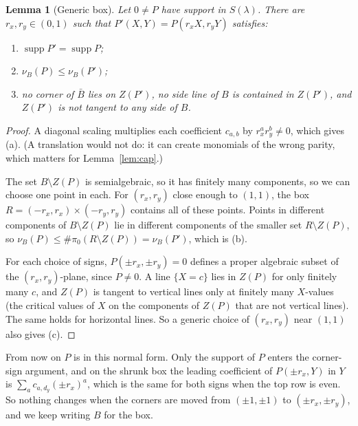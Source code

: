 \documentclass[11pt]{amsart}
\newtheorem{lemma}[theorem]{Lemma}
\theoremstyle{definition}
\theoremstyle{remark}
\newcommand{\supp}{\operatorname{supp}}
\numberwithin{equation}{section}
\begin{document}
\begin{lemma}[Generic box]\label{lem:box}
Let $0\ne P$ have support in $S(\lambda)$. There are $r_x,r_y\in(0,1)$ such that
$P'(X,Y)=P(r_xX,r_yY)$ satisfies:
\begin{enumerate}[label=(\alph*),nosep]
\item $\supp P'=\supp P$;
\item $\nu_B(P)\le\nu_B(P')$;
\item no corner of $\bar B$ lies on $Z(P')$, no side line of $B$ is contained in $Z(P')$,
and $Z(P')$ is not tangent to any side of $B$.
\end{enumerate}
\end{lemma}

\begin{proof}
A diagonal scaling multiplies each coefficient $c_{a,b}$ by $r_x^ar_y^b\ne0$, which gives (a).
(A translation would not do: it can create monomials of the wrong parity, which matters
for Lemma~\ref{lem:cap}.)

The set $B\setminus Z(P)$ is semialgebraic, so it has finitely many components, so we can choose one
point in each. For $(r_x,r_y)$ close enough to $(1,1)$, the box
$R=(-r_x,r_x)\times(-r_y,r_y)$ contains all of these points. Points in different
components of $B\setminus Z(P)$ lie in different components of the smaller set
$R\setminus Z(P)$, so $\nu_B(P)\le\#\pi_0(R\setminus Z(P))=\nu_B(P')$, which is (b).

For each choice of signs, $P(\pm r_x,\pm r_y)=0$ defines a proper algebraic subset of the
$(r_x,r_y)$-plane, since $P\ne0$. A line $\{X=c\}$ lies in $Z(P)$ for only finitely many
$c$, and $Z(P)$ is tangent to vertical lines only at finitely many $X$-values (the critical
values of $X$ on the components of $Z(P)$ that are not vertical lines). The same holds for
horizontal lines. So a generic choice of $(r_x,r_y)$ near $(1,1)$ also gives (c).
\end{proof}

From now on $P$ is in this normal form. Only the support of $P$ enters the corner-sign
argument, and on the shrunk box the leading coefficient of $P(\pm r_x,Y)$ in $Y$ is
$\sum_ac_{a,d_y}(\pm r_x)^a$, which is the same for both signs when the top row is even.
So nothing changes when the corners are moved from $(\pm1,\pm1)$ to $(\pm r_x,\pm r_y)$, and we
keep writing $B$ for the box.
\end{document}
